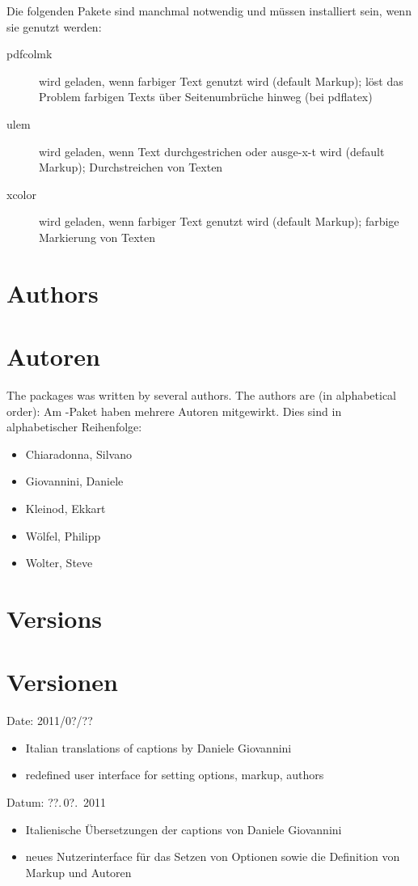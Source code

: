 		Die folgenden Pakete sind manchmal notwendig und müssen installiert sein, wenn sie genutzt werden:
		\begin{description}
			\item [pdfcolmk] wird geladen, wenn farbiger Text genutzt wird (default Markup); löst das Problem farbigen Texts über Seitenumbrüche hinweg (bei pdflatex)
			\item [ulem] wird geladen, wenn Text durchgestrichen oder ausge-x-t wird (default Markup); Durchstreichen von Texten
			\item [xcolor] wird geladen, wenn farbiger Text genutzt wird (default Markup); farbige Markierung von Texten
		\end{description}
	\fi

\ifENGLISH
	\section{Authors}
\fi
	\ifGERMAN
		\section{Autoren}
	\fi
\label{sec:authors}

\ifENGLISH
	The  packages was written by several authors.
	The authors are (in alphabetical order):
\fi
	\ifGERMAN
		Am -Paket haben mehrere Autoren mitgewirkt.
		Dies sind in alphabetischer Reihenfolge:
	\fi
\begin{itemize}
	\item Chiaradonna, Silvano
	\item Giovannini, Daniele
	\item Kleinod, Ekkart
	\item Wölfel, Philipp
	\item Wolter, Steve
\end{itemize}

\ifENGLISH
	\section{Versions}
\fi
	\ifGERMAN
		\section{Versionen}
	\fi
\label{sec:versions}


\ifENGLISH
	Date: 2011/0?/??
	\begin{itemize}
		\item Italian translations of captions by Daniele Giovannini
		\item redefined user interface for setting options, markup, authors
	\end{itemize}
\fi
	\ifGERMAN
		Datum: ??.\,0?.~2011
		\begin{itemize}
			\item Italienische Übersetzungen der captions von Daniele Giovannini
			\item neues Nutzerinterface für das Setzen von Optionen sowie die Definition von Markup und Autoren
		\end{itemize}
	\fi

